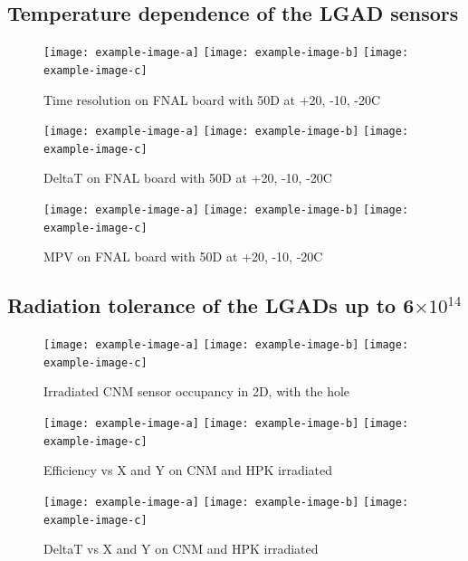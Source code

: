 \documentclass[preprint,1p]{elsarticle}
\begin{document}
\subsection{Temperature dependence of the LGAD sensors}

\begin{figure}[htbp] 
\centering
\texttt{[image: example-image-a]} 
\texttt{[image: example-image-b]} 
\texttt{[image: example-image-c]} 
\caption{Time resolution on FNAL board with 50D at +20, -10, -20C} 
\label{fig:Sensors} 
\end{figure} 

\begin{figure}[htbp] 
\centering
\texttt{[image: example-image-a]} 
\texttt{[image: example-image-b]} 
\texttt{[image: example-image-c]} 
\caption{DeltaT on FNAL board with 50D at +20, -10, -20C} 
\label{fig:Sensors} 
\end{figure} 


\begin{figure}[htbp] 
\centering
\texttt{[image: example-image-a]} 
\texttt{[image: example-image-b]} 
\texttt{[image: example-image-c]} 
\caption{MPV on FNAL board with 50D at +20, -10, -20C} 
\label{fig:Sensors} 
\end{figure} 

\subsection{Radiation tolerance of the LGADs up to 6$\times 10^{14}$}

\begin{figure}[htbp] 
\centering
\texttt{[image: example-image-a]} 
\texttt{[image: example-image-b]} 
\texttt{[image: example-image-c]} 
\caption{Irradiated CNM sensor occupancy in 2D, with the hole} 
\label{fig:Sensors} 
\end{figure} 

\begin{figure}[htbp] 
\centering
\texttt{[image: example-image-a]} 
\texttt{[image: example-image-b]} 
\texttt{[image: example-image-c]} 
\caption{Efficiency vs X and Y on CNM and HPK irradiated} 
\label{fig:Sensors} 
\end{figure} 

\begin{figure}[htbp] 
\centering
\texttt{[image: example-image-a]} 
\texttt{[image: example-image-b]} 
\texttt{[image: example-image-c]} 
\caption{DeltaT vs X and Y on CNM and HPK irradiated} 
\label{fig:Sensors} 
\end{figure} 
\end{document}
